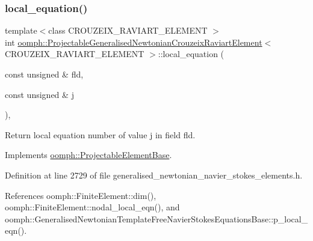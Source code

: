 \subsubsection{\texorpdfstring{local\+\_\+equation()}{local\_equation()}}
{\footnotesize\ttfamily template$<$class C\+R\+O\+U\+Z\+E\+I\+X\+\_\+\+R\+A\+V\+I\+A\+R\+T\+\_\+\+E\+L\+E\+M\+E\+NT $>$ \\
int \hyperlink{classoomph_1_1ProjectableGeneralisedNewtonianCrouzeixRaviartElement}{oomph\+::\+Projectable\+Generalised\+Newtonian\+Crouzeix\+Raviart\+Element}$<$ C\+R\+O\+U\+Z\+E\+I\+X\+\_\+\+R\+A\+V\+I\+A\+R\+T\+\_\+\+E\+L\+E\+M\+E\+NT $>$\+::local\+\_\+equation (\begin{DoxyParamCaption}\item[{const unsigned \&}]{fld,  }\item[{const unsigned \&}]{j }\end{DoxyParamCaption})\hspace{0.3cm}{\ttfamily [inline]}, {\ttfamily [virtual]}}



Return local equation number of value j in field fld. 



Implements \hyperlink{classoomph_1_1ProjectableElementBase_ac5c27ae929ff636dc7747fe23fd4f738}{oomph\+::\+Projectable\+Element\+Base}.



Definition at line 2729 of file generalised\+\_\+newtonian\+\_\+navier\+\_\+stokes\+\_\+elements.\+h.



References oomph\+::\+Finite\+Element\+::dim(), oomph\+::\+Finite\+Element\+::nodal\+\_\+local\+\_\+eqn(), and oomph\+::\+Generalised\+Newtonian\+Template\+Free\+Navier\+Stokes\+Equations\+Base\+::p\+\_\+local\+\_\+eqn().

\mbox{\label{classoomph_1_1ProjectableGeneralisedNewtonianCrouzeixRaviartElement_a6c8b647ec31436a5f35e4eee2cd678b6}} 
